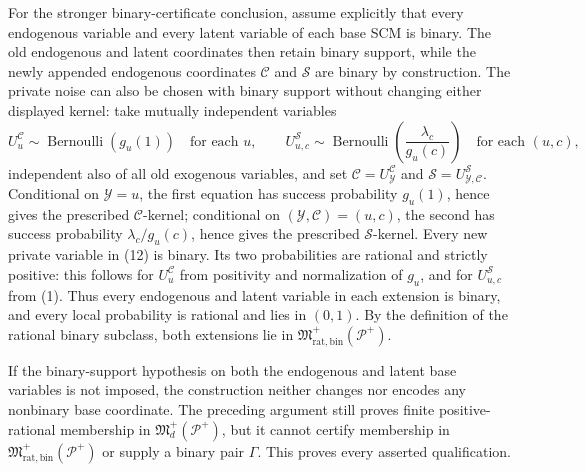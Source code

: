 For the stronger binary-certificate conclusion, assume explicitly that every endogenous variable and every latent variable of each base SCM is binary. The old endogenous and latent coordinates then retain binary support, while the newly appended endogenous coordinates \(\mathcal C\) and \(\mathcal S\) are binary by construction. The private noise can also be chosen with binary support without changing either displayed kernel: take mutually independent variables
\[
 U^{\mathcal C}_u\sim\operatorname{Bernoulli}(g_u(1))
 \quad\text{for each }u,
 \qquad
 U^{\mathcal S}_{u,c}\sim
 \operatorname{Bernoulli}\!\left(\frac{\lambda_c}{g_u(c)}\right)
 \quad\text{for each }(u,c),                              \tag{12}
\]
independent also of all old exogenous variables, and set \(\mathcal C=U^{\mathcal C}_{\mathcal Y}\) and \(\mathcal S=U^{\mathcal S}_{\mathcal Y,\mathcal C}\). Conditional on \(\mathcal Y=u\), the first equation has success probability \(g_u(1)\), hence gives the prescribed \(\mathcal C\)-kernel; conditional on \((\mathcal Y,\mathcal C)=(u,c)\), the second has success probability \(\lambda_c/g_u(c)\), hence gives the prescribed \(\mathcal S\)-kernel. Every new private variable in (12) is binary. Its two probabilities are rational and strictly positive: this follows for \(U^{\mathcal C}_u\) from positivity and normalization of \(g_u\), and for \(U^{\mathcal S}_{u,c}\) from (1). Thus every endogenous and latent variable in each extension is binary, and every local probability is rational and lies in \((0,1)\). By the definition of the rational binary subclass, both extensions lie in \(\mathfrak M_{\mathrm{rat,bin}}^+(\mathcal P^+)\).

If the binary-support hypothesis on both the endogenous and latent base variables is not imposed, the construction neither changes nor encodes any nonbinary base coordinate. The preceding argument still proves finite positive-rational membership in \(\mathfrak M_d^+(\mathcal P^+)\), but it cannot certify membership in \(\mathfrak M_{\mathrm{rat,bin}}^+(\mathcal P^+)\) or supply a binary pair \(\Gamma\). This proves every asserted qualification.
